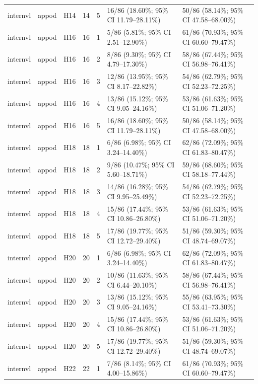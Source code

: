 \begin{longtable}{lllrrll}
internvl & appod & H14 & 14 & 5 & 16/86 (18.60\%; 95\% CI 11.79–28.11\%) & 50/86 (58.14\%; 95\% CI 47.58–68.00\%) \\
internvl & appod & H16 & 16 & 1 & 5/86 (5.81\%; 95\% CI 2.51–12.90\%) & 61/86 (70.93\%; 95\% CI 60.60–79.47\%) \\
internvl & appod & H16 & 16 & 2 & 8/86 (9.30\%; 95\% CI 4.79–17.30\%) & 58/86 (67.44\%; 95\% CI 56.98–76.41\%) \\
internvl & appod & H16 & 16 & 3 & 12/86 (13.95\%; 95\% CI 8.17–22.82\%) & 54/86 (62.79\%; 95\% CI 52.23–72.25\%) \\
internvl & appod & H16 & 16 & 4 & 13/86 (15.12\%; 95\% CI 9.05–24.16\%) & 53/86 (61.63\%; 95\% CI 51.06–71.20\%) \\
internvl & appod & H16 & 16 & 5 & 16/86 (18.60\%; 95\% CI 11.79–28.11\%) & 50/86 (58.14\%; 95\% CI 47.58–68.00\%) \\
internvl & appod & H18 & 18 & 1 & 6/86 (6.98\%; 95\% CI 3.24–14.40\%) & 62/86 (72.09\%; 95\% CI 61.83–80.47\%) \\
internvl & appod & H18 & 18 & 2 & 9/86 (10.47\%; 95\% CI 5.60–18.71\%) & 59/86 (68.60\%; 95\% CI 58.18–77.44\%) \\
internvl & appod & H18 & 18 & 3 & 14/86 (16.28\%; 95\% CI 9.95–25.49\%) & 54/86 (62.79\%; 95\% CI 52.23–72.25\%) \\
internvl & appod & H18 & 18 & 4 & 15/86 (17.44\%; 95\% CI 10.86–26.80\%) & 53/86 (61.63\%; 95\% CI 51.06–71.20\%) \\
internvl & appod & H18 & 18 & 5 & 17/86 (19.77\%; 95\% CI 12.72–29.40\%) & 51/86 (59.30\%; 95\% CI 48.74–69.07\%) \\
internvl & appod & H20 & 20 & 1 & 6/86 (6.98\%; 95\% CI 3.24–14.40\%) & 62/86 (72.09\%; 95\% CI 61.83–80.47\%) \\
internvl & appod & H20 & 20 & 2 & 10/86 (11.63\%; 95\% CI 6.44–20.10\%) & 58/86 (67.44\%; 95\% CI 56.98–76.41\%) \\
internvl & appod & H20 & 20 & 3 & 13/86 (15.12\%; 95\% CI 9.05–24.16\%) & 55/86 (63.95\%; 95\% CI 53.41–73.30\%) \\
internvl & appod & H20 & 20 & 4 & 15/86 (17.44\%; 95\% CI 10.86–26.80\%) & 53/86 (61.63\%; 95\% CI 51.06–71.20\%) \\
internvl & appod & H20 & 20 & 5 & 17/86 (19.77\%; 95\% CI 12.72–29.40\%) & 51/86 (59.30\%; 95\% CI 48.74–69.07\%) \\
internvl & appod & H22 & 22 & 1 & 7/86 (8.14\%; 95\% CI 4.00–15.86\%) & 61/86 (70.93\%; 95\% CI 60.60–79.47\%) \\

\end{longtable}
